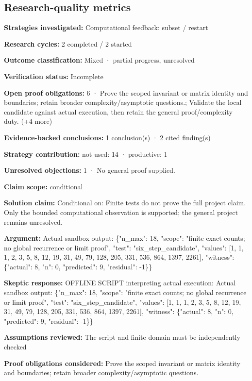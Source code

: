 \documentclass[11pt]{article}
\begin{document}
\subsection{Research-quality metrics}
\textbf{Strategies investigated:} Computational feedback: subset / restart\par
\textbf{Research cycles:} 2 completed / 2 started\par
\textbf{Outcome classification:} Mixed · partial progress, unresolved\par
\textbf{Verification status:} Incomplete\par
\textbf{Open proof obligations:} 6 · Prove the scoped invariant or matrix identity and boundaries; retain broader complexity/asymptotic questions.; Validate the local candidate against actual execution, then retain the general proof/complexity duty. (+4 more)\par
\textbf{Evidence-backed conclusions:} 1 conclusion(s) · 2 cited finding(s)\par
\textbf{Strategy contribution:} not used: 14 · productive: 1\par
\textbf{Unresolved objections:} 1 · No general proof supplied.\par
\textbf{Claim scope:} conditional\par
\textbf{Solution claim:} Conditional on: Finite tests do not prove the full project claim. Only the bounded computational observation is supported; the general project remains unresolved.\par
\textbf{Argument:} Actual sandbox output: \{"n\_max": 18, "scope": "finite exact counts; no global recurrence or limit proof", "test": "six\_step\_candidate", "values": [1, 1, 1, 2, 3, 5, 8, 12, 19, 31, 49, 79, 128, 205, 331, 536, 864, 1397, 2261], "witness": \{"actual": 8, "n": 0, "predicted": 9, "residual": -1\}\}\par
\textbf{Skeptic response:} OFFLINE SCRIPT interpreting actual execution: Actual sandbox output: \{"n\_max": 18, "scope": "finite exact counts; no global recurrence or limit proof", "test": "six\_step\_candidate", "values": [1, 1, 1, 2, 3, 5, 8, 12, 19, 31, 49, 79, 128, 205, 331, 536, 864, 1397, 2261], "witness": \{"actual": 8, "n": 0, "predicted": 9, "residual": -1\}\}\par
\textbf{Assumptions reviewed:} The script and finite domain must be independently checked\par
\textbf{Proof obligations considered:} Prove the scoped invariant or matrix identity and boundaries; retain broader complexity/asymptotic questions.\par
\end{document}
